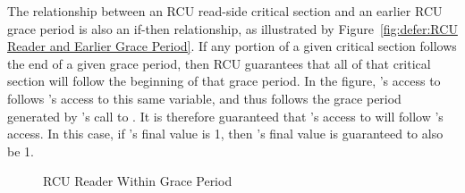 The relationship between an RCU read-side critical section and an earlier
RCU grace period is also an if-then relationship, as illustrated by
Figure~\ref{fig:defer:RCU Reader and Earlier Grace Period}.
If any portion of a given critical section follows the end of
a given grace period, then RCU guarantees that all of that critical
section will follow the beginning of that grace period.
In the figure, 's access to  follows 's access
to this same variable, and thus follows the grace period generated by
's call to .
It is therefore guaranteed that 's access to  will follow
's access.  In this case, if 's final value is 1, then
's final value is guaranteed to also be 1.

\QuickQuizEnd

\begin{figure}
\centering
{}
\caption{RCU Reader Within Grace Period}
\label{fig:defer:RCU Reader Within Grace Period}
\end{figure}

